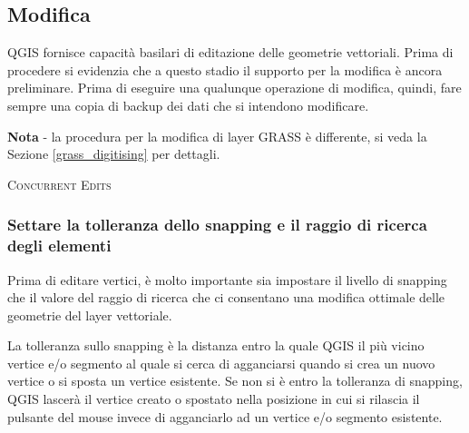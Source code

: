 \subsection{Modifica}

QGIS fornisce capacità basilari di editazione delle geometrie vettoriali.
Prima di procedere si evidenzia che a questo stadio il supporto per la modifica
è ancora preliminare.
Prima di eseguire una qualunque operazione di modifica, quindi, fare sempre una
copia di backup dei dati che si intendono modificare. 

\textbf{Nota} - la procedura per la modifica di layer GRASS è differente, si
veda la Sezione \ref{grass_digitising} per dettagli.

\begin{Tip}[ht]\caption{\textsc{Concurrent Edits}}
\end{Tip}

\subsubsection{Settare la tolleranza dello snapping e il raggio di ricerca
degli elementi}

Prima di editare vertici, è molto importante sia impostare il livello di snapping
che il valore del raggio di ricerca che ci consentano una modifica ottimale delle
geometrie del layer vettoriale. 


La tolleranza sullo snapping è la distanza entro la quale QGIS
 il più vicino vertice e/o segmento al quale si cerca di
agganciarsi quando si crea un nuovo vertice o si sposta un vertice esistente.
Se non si è entro la tolleranza di snapping, QGIS lascerà il vertice creato o
spostato nella posizione in cui si rilascia il pulsante del mouse invece di
agganciarlo ad un vertice e/o segmento esistente. 

